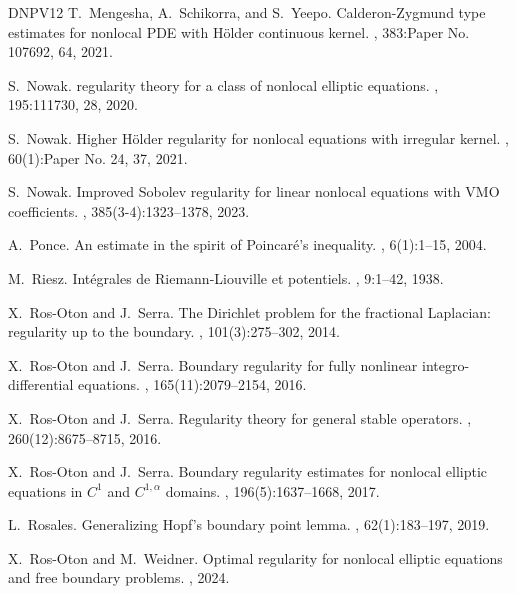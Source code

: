 \documentclass[11pt,reqno]{amsart}
\theoremstyle{plain}
\theoremstyle{definition}
\numberwithin{equation}{section}
\newcommand{\1}{\mathbbm{1}}
\begin{document}
\begin{thebibliography}{DNPV12}
T.~Mengesha, A.~Schikorra, and S.~Yeepo.
\newblock Calderon-{Z}ygmund type estimates for nonlocal {PDE} with {H}\"older
  continuous kernel.
, 383:Paper No. 107692, 64, 2021.

S.~Nowak.
 regularity theory for a class of nonlocal elliptic
  equations.
, 195:111730, 28, 2020.

S.~Nowak.
\newblock Higher {H}\"older regularity for nonlocal equations with irregular
  kernel.
, 60(1):Paper No. 24,
  37, 2021.

S.~Nowak.
\newblock Improved {S}obolev regularity for linear nonlocal equations with
  {VMO} coefficients.
, 385(3-4):1323--1378, 2023.

A.~Ponce.
\newblock An estimate in the spirit of {P}oincar\'{e}'s inequality.
, 6(1):1--15, 2004.

M.~Riesz.
\newblock Int{\'e}grales de {R}iemann-{L}iouville et potentiels.
, 9:1--42, 1938.

X.~Ros-Oton and J.~Serra.
\newblock The {D}irichlet problem for the fractional {L}aplacian: regularity up
  to the boundary.
, 101(3):275--302, 2014.

X.~Ros-Oton and J.~Serra.
\newblock Boundary regularity for fully nonlinear integro-differential
  equations.
, 165(11):2079--2154, 2016.

X.~Ros-Oton and J.~Serra.
\newblock Regularity theory for general stable operators.
, 260(12):8675--8715, 2016.

X.~Ros-Oton and J.~Serra.
\newblock Boundary regularity estimates for nonlocal elliptic equations in
  {$C^1$} and {$C^{1,\alpha}$} domains.
, 196(5):1637--1668, 2017.

L.~Rosales.
\newblock Generalizing {H}opf's boundary point lemma.
, 62(1):183--197, 2019.

X.~Ros-Oton and M.~Weidner.
\newblock Optimal regularity for nonlocal elliptic equations and free boundary
  problems.
, 2024.


\end{thebibliography}
\end{document}

